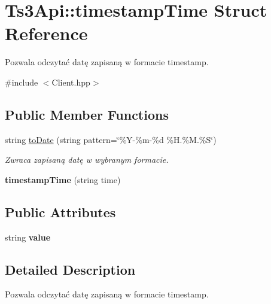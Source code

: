 \hypertarget{struct_ts3_api_1_1timestamp_time}{}\section{Ts3\+Api\+:\+:timestamp\+Time Struct Reference}
\label{struct_ts3_api_1_1timestamp_time}


Pozwala odczytać datę zapisaną w formacie timestamp.  




{\ttfamily \#include $<$Client.\+hpp$>$}

\subsection*{Public Member Functions}
\begin{DoxyCompactItemize}
\item 
string \hyperlink{struct_ts3_api_1_1timestamp_time_a39b2ad782e579670bad4888682cab8af}{to\+Date} (string pattern=\char`\"{}\%Y-\/\%m-\/\%d \%H.\%M.\%S\char`\"{})
\begin{DoxyCompactList}\small\item\em Zwraca zapisaną datę w wybranym formacie. \end{DoxyCompactList}\item 
{\bfseries timestamp\+Time} (string time)\hypertarget{struct_ts3_api_1_1timestamp_time_a6edd44d64e57b0c27a02701b90054cd4}{}\label{struct_ts3_api_1_1timestamp_time_a6edd44d64e57b0c27a02701b90054cd4}

\end{DoxyCompactItemize}
\subsection*{Public Attributes}
\begin{DoxyCompactItemize}
\item 
string {\bfseries value}\hypertarget{struct_ts3_api_1_1timestamp_time_a12c07c856dd422e610aeedb4048532b4}{}\label{struct_ts3_api_1_1timestamp_time_a12c07c856dd422e610aeedb4048532b4}

\end{DoxyCompactItemize}


\subsection{Detailed Description}
Pozwala odczytać datę zapisaną w formacie timestamp. 

